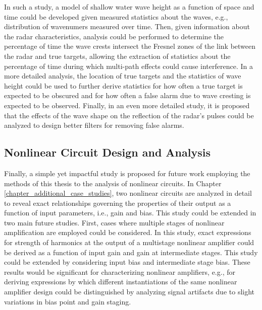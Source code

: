 In such a study, a model of shallow water wave height as a function of space and time could be developed given measured statistics about the waves, e.g., distribution of wavenumers measured over time.  Then, given information about the radar characteristics, analysis could be performed to determine the percentage of time the wave crests intersect the Fresnel zones of the link between the radar and true targets, allowing the extraction of statistics about the percentage of time during which multi-path effects could cause interference.  In a more detailed analysis, the location of true targets and the statistics of wave height could be used to further derive statistics for how often a true target is expected to be obscured and for how often a false alarm due to wave cresting is expected to be observed.  Finally, in an even more detailed study, it is proposed that the effects of the wave shape on the reflection of the radar's pulses could be analyzed to design better filters for removing false alarms.

\subsection{Nonlinear Circuit Design and Analysis}

Finally, a simple yet impactful study is proposed for future work employing the methods of this thesis to the analysis of nonlinear circuits.  In Chapter \ref{chapter_additional_case_studies}, two nonlinear circuits are analyzed in detail to reveal exact relationships governing the properties of their output as a function of input parameters, i.e., gain and bias.  This study could be extended in two main future studies.  First, cases where multiple stages of nonlinear amplification are employed could be considered.  In this study, exact expressions for strength of harmonics at the output of a multistage nonlinear amplifier could be derived as a function of input gain and gain at intermediate stages.  This study could be extended by considering input bias and intermediate stage bias.  These results would be significant for characterizing nonlinear amplifiers, e.g., for deriving expressions by which different instantiations of the same nonlinear amplifier design could be distinguished by analyzing signal artifacts due to slight variations in bias point and gain staging.

